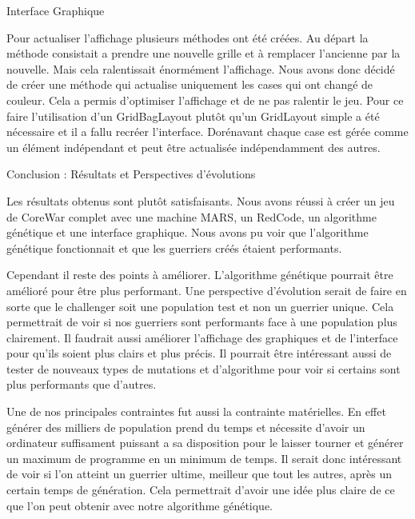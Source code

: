 \documentclass[a4paper, 10pt]{article}
\begin{document}
\begin{section}{Interface Graphique}
        \par
            Pour actualiser l'affichage plusieurs méthodes ont été créées. Au départ la méthode consistait a prendre une nouvelle grille et à remplacer l'ancienne par la nouvelle. Mais cela ralentissait énormément l'affichage. Nous avons donc décidé de créer une méthode qui actualise uniquement les cases qui ont changé de couleur. Cela a permis d'optimiser l'affichage et de ne pas ralentir le jeu.
            Pour ce faire l'utilisation d'un GridBagLayout plutôt qu'un GridLayout simple a été nécessaire et il a fallu recréer l'interface. Dorénavant chaque case est gérée comme un élément indépendant et peut être actualisée indépendamment des autres.
    \end{section}

    \begin{section}{Conclusion : Résultats et Perspectives d'évolutions}\label{sec:resultats}
        \par
            Les résultats obtenus sont plutôt satisfaisants. Nous avons réussi à créer un jeu de CoreWar complet avec une machine MARS, un RedCode, un algorithme génétique et une interface graphique. Nous avons pu voir que l'algorithme génétique fonctionnait et que les guerriers créés étaient performants.
            \medskip
        \par
            Cependant il reste des points à améliorer. L'algorithme génétique pourrait être amélioré pour être plus performant. Une perspective d'évolution serait de faire en sorte que le challenger soit une population test et non un guerrier unique. Cela permettrait de voir si nos guerriers sont performants face à une population plus clairement. Il faudrait aussi améliorer l'affichage des graphiques et de l'interface pour qu'ils soient plus clairs et plus précis.
            Il pourrait être intéressant aussi de tester de nouveaux types de mutations et d'algorithme pour voir si certains sont plus performants que d'autres.
            \medskip
        \par
            Une de nos principales contraintes fut aussi la contrainte matérielles. En effet générer des milliers de population prend du temps et nécessite d'avoir un ordinateur suffisament puissant a sa disposition pour le laisser tourner et générer un maximum de programme en un minimum de temps. Il serait donc intéressant de voir si l'on atteint un guerrier ultime, meilleur que tout les autres, après un certain temps de génération. Cela permettrait d'avoir une idée plus claire de ce que l'on peut obtenir avec notre algorithme génétique.

\end{section}
\end{document}
